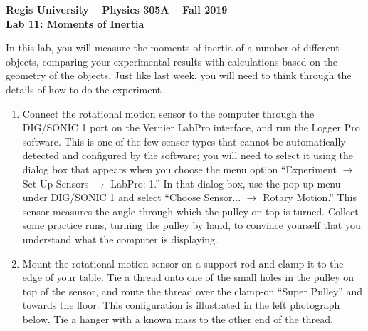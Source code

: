 \documentclass[11pt]{article}
\begin{document}
\begin{center}
{\bf{Regis University -- Physics 305A -- Fall 2019}} \\
{\bf{Lab 11: Moments of Inertia}} \\
\end{center}

In this lab, you will measure the moments of inertia of a number of different
objects, comparing your experimental results with calculations based on
the geometry of the objects.  Just like last week, you will need to 
think through the details of how to do the experiment.

\bigskip

\begin{enumerate}
\item Connect the rotational motion sensor to the computer through 
the DIG/SONIC 1 port on the Vernier LabPro interface, and run the 
Logger Pro software.  This is one of the few sensor types that cannot be 
automatically detected and configured by the software; you will need to 
select it using the dialog box that appears when you choose the menu option
``Experiment $\rightarrow$ Set Up Sensors $\rightarrow$ LabPro: 1.''  
In that dialog box, use the pop-up menu under DIG/SONIC 1 and 
select ``Choose Sensor... $\rightarrow$ Rotary Motion.''
This sensor measures the angle through which the pulley on top is turned.  
Collect some practice runs, turning the pulley by hand, to convince yourself 
that you understand what the computer is displaying.
\item Mount the rotational motion sensor on a support rod and clamp it to 
the edge of your table.  Tie a thread onto one of the small holes in the 
pulley on top of the sensor, and route the thread
over the clamp-on ``Super Pulley'' and towards the floor.  This configuration 
is illustrated in the left photograph below.  Tie a hanger with a known mass 
to the other end of the thread.
\begin{center}

\end{center}
\end{enumerate}
\end{document}
